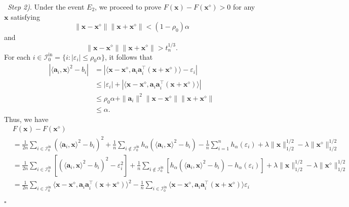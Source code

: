 \documentclass[10pt,a4paper]{amsart}
\newenvironment{proof}{{\noindent\bf Proof.}\,}{\hfill $\square$\par\mbox{}}
\begin{document}
\begin{proof}
	\textit{Step 2)}. Under the event $E_2$, we proceed to prove $F(\mathbf{x})-F(\mathbf{x}^\diamond)>0$ for any $\mathbf{x}$ satisfying
	$$\|\mathbf{x}-\mathbf{x}^\diamond\|\|\mathbf{x}+\mathbf{x}^\diamond\|<  (1-\rho_0)\alpha$$
	and 
	$$\|\mathbf{x}-\mathbf{x}^\diamond\| \|\mathbf{x}+\mathbf{x}^\diamond\|> t_n^{1/3}.
	$$
	For each $i\in\mathcal{I}_{0}^{\mathrm{in}}=\{i:|\varepsilon_i|\leq\rho_0\alpha\}$, it follows that
	\begin{equation}
		\begin{aligned}\label{index_in}
			|\langle \mathbf{a}_i,\mathbf{x}\rangle^2-b_i|&=|\langle \mathbf{x}-\mathbf{x}^\diamond, \mathbf{a}_i\mathbf{a}_i^\top(\mathbf{x}+\mathbf{x}^\diamond)\rangle-\varepsilon_i|\\
			&\leq|\varepsilon_i|+|\langle \mathbf{x}-\mathbf{x}^\diamond, \mathbf{a}_i\mathbf{a}_i^\top(\mathbf{x}+\mathbf{x}^\diamond)\rangle|\\
			&\leq\rho_0\alpha+\|\mathbf{a}_i\|^2\|\mathbf{x}-\mathbf{x}^\diamond\|\|\mathbf{x}+\mathbf{x}^\diamond\|\\
			&\leq\alpha.
		\end{aligned}
	\end{equation}
	Thus, we have
	\begin{equation}\label{FFr1}
		\begin{aligned}
			&F(\mathbf{x})-F(\mathbf{x}^\diamond)\\
			&=\frac{1}{2n}\sum_{i\in\mathcal{I}_{0}^{\mathrm{in}}}(\langle \mathbf{a}_i,\mathbf{x}\rangle^2-b_i)^2+\frac{1}{n}\sum_{i\notin\mathcal{I}_{0}^{\mathrm{in}}}
			h_{\alpha}(\langle \mathbf{a}_i,\mathbf{x}\rangle^2-b_i)-\frac{1}{n}\sum_{i=1}^n		h_{\alpha}(\varepsilon_i)+\lambda\|\mathbf{x}\|_{1/2}^{1/2}-\lambda\|\mathbf{x}^\diamond\|_{1/2}^{1/2}\\
			&=\frac{1}{2n}\sum_{i\in\mathcal{I}_{0}^{\mathrm{in}}}[(\langle \mathbf{a}_i,\mathbf{x}\rangle^2-b_i)^2-	\varepsilon_i^2]+\frac{1}{n}\sum_{i\notin\mathcal{I}_{0}^{\mathrm{in}}}
			[h_{\alpha}(\langle \mathbf{a}_i,\mathbf{x}\rangle^2-b_i)-	h_{\alpha}(\varepsilon_i)]
			+\lambda\|\mathbf{x}\|_{1/2}^{1/2}-\lambda\|\mathbf{x}^\diamond\|_{1/2}^{1/2}\\
			&=\frac{1}{2n}\sum_{i\in\mathcal{I}_{0}^{\mathrm{in}}}\langle \mathbf{x}-\mathbf{x}^\diamond, \mathbf{a}_i\mathbf{a}_i^\top(\mathbf{x}+\mathbf{x}^\diamond)\rangle^2
			-\frac{1}{n}\sum_{i\in\mathcal{I}_{0}^{\mathrm{in}}}\langle \mathbf{x}-\mathbf{x}^\diamond, \mathbf{a}_i\mathbf{a}_i^\top(\mathbf{x}+\mathbf{x}^\diamond)\rangle\varepsilon_i\\

\end{aligned}
\end{equation}
\end{proof}
\end{document}
